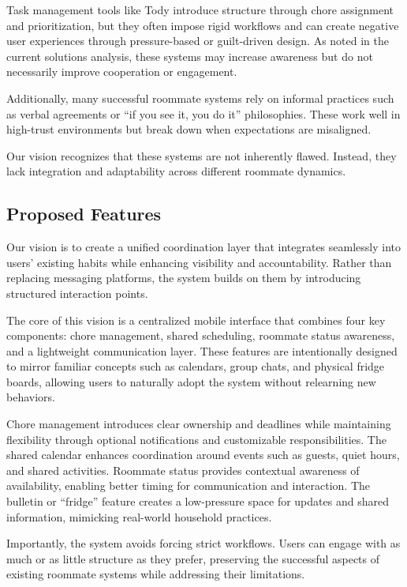 \documentclass[sigconf]{acmart}
\begin{document}
Task management tools like Tody introduce structure through chore assignment and prioritization, but they often impose rigid workflows and can create negative user experiences through pressure-based or guilt-driven design. As noted in the current solutions analysis, these systems may increase awareness but do not necessarily improve cooperation or engagement.

Additionally, many successful roommate systems rely on informal practices such as verbal agreements or ``if you see it, you do it'' philosophies. These work well in high-trust environments but break down when expectations are misaligned.

Our vision recognizes that these systems are not inherently flawed. Instead, they lack integration and adaptability across different roommate dynamics.

\subsection{Proposed Features}
Our vision is to create a unified coordination layer that integrates seamlessly into users' existing habits while enhancing visibility and accountability. Rather than replacing messaging platforms, the system builds on them by introducing structured interaction points.

The core of this vision is a centralized mobile interface that combines four key components: chore management, shared scheduling, roommate status awareness, and a lightweight communication layer. These features are intentionally designed to mirror familiar concepts such as calendars, group chats, and physical fridge boards, allowing users to naturally adopt the system without relearning new behaviors.

Chore management introduces clear ownership and deadlines while maintaining flexibility through optional notifications and customizable responsibilities. The shared calendar enhances coordination around events such as guests, quiet hours, and shared activities. Roommate status provides contextual awareness of availability, enabling better timing for communication and interaction. The bulletin or ``fridge'' feature creates a low-pressure space for updates and shared information, mimicking real-world household practices.

Importantly, the system avoids forcing strict workflows. Users can engage with as much or as little structure as they prefer, preserving the successful aspects of existing roommate systems while addressing their limitations.
\end{document}
